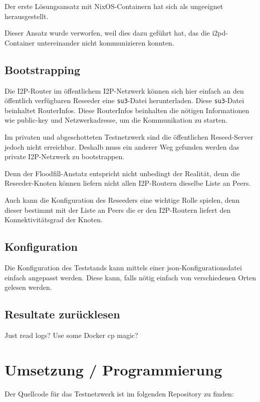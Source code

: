 Der erste Lösungsansatz mit NixOS-Containern hat sich als ungeeignet herausgestellt. 

Dieser Ansatz wurde verworfen, weil dies dazu geführt hat, das die i2pd-Container untereinander nicht kommunizieren konnten.

\subsection{Bootstrapping}

Die I2P-Router im öffentlichem I2P-Netzwerk können sich hier einfach an den öffentlich verfügbaren Reseeder eine \lstinline|su3|-Datei herunterladen.
Diese \lstinline|su3|-Datei beinhaltet RouterInfos. 
Diese RouterInfos beinhalten die nötigen Informationen wie public-key und Netzwerkadresse, um die Kommunikation zu starten.

Im privaten und abgeschotteten Testnetzwerk sind die öffentlichen Reseed-Server jedoch nicht erreichbar.
Deshalb muss ein anderer Weg gefunden werden das private I2P-Netzwerk zu bootstrappen.



Denn der Floodfill-Anstatz entspricht nicht unbedingt der Realität, denn die Reseeder-Knoten können liefern nicht allen I2P-Routern dieselbe Liste an Peers.

Auch kann die Konfiguration des Reseeders eine wichtige Rolle spielen, denn dieser bestimmt mit der Liste an Peers die er den I2P-Routern liefert den Konnektivitätsgrad der Knoten.


\subsection{Konfiguration}

Die Konfiguration des Teststands kann mittels einer json-Konfigurationsdatei einfach angepasst werden.
Diese kann, falls nötig einfach von verschiedenen Orten gelesen werden.

\subsection{Resultate zurücklesen}

Just read logs? Use some Docker cp magic?

\section{Umsetzung / Programmierung}

Der Quellcode für das Testnetzwerk ist im folgenden Repository zu finden:

